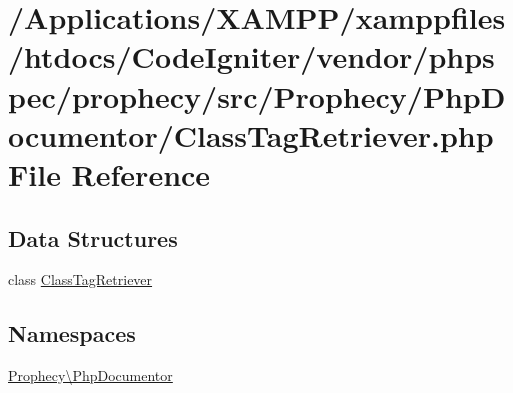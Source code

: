 \hypertarget{_class_tag_retriever_8php}{}\section{/\+Applications/\+X\+A\+M\+P\+P/xamppfiles/htdocs/\+Code\+Igniter/vendor/phpspec/prophecy/src/\+Prophecy/\+Php\+Documentor/\+Class\+Tag\+Retriever.php File Reference}
\label{_class_tag_retriever_8php}
\subsection*{Data Structures}
\begin{DoxyCompactItemize}
\item 
class \mbox{\hyperlink{class_prophecy_1_1_php_documentor_1_1_class_tag_retriever}{Class\+Tag\+Retriever}}
\end{DoxyCompactItemize}
\subsection*{Namespaces}
\begin{DoxyCompactItemize}
\item 
 \mbox{\hyperlink{namespace_prophecy_1_1_php_documentor}{Prophecy\textbackslash{}\+Php\+Documentor}}
\end{DoxyCompactItemize}
